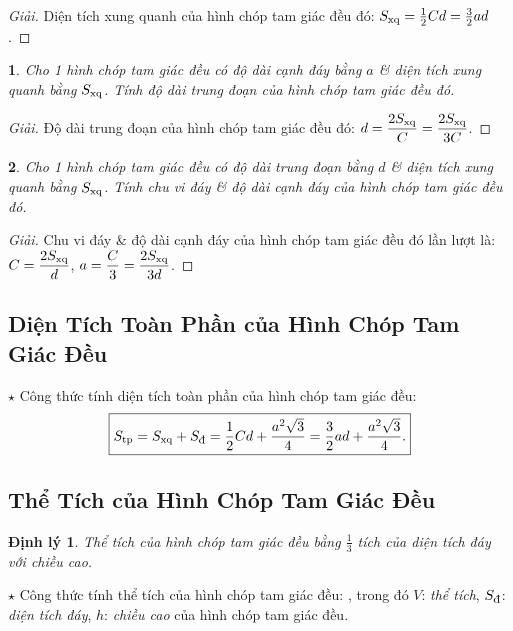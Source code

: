 \documentclass{article}
\newtheorem{baitoan}{}
\newtheorem{dinhly}{Định lý}
\begin{document}
\begin{proof}[Giải]
	Diện tích xung quanh của hình chóp tam giác đều đó: $S_{\rm xq} = \frac{1}{2}Cd = \frac{3}{2}ad$.
\end{proof}

\begin{baitoan}
	Cho 1 hình chóp tam giác đều có độ dài cạnh đáy bằng $a$ \& diện tích xung quanh bằng $S_{\rm xq}$. Tính độ dài trung đoạn của hình chóp tam giác đều đó.
\end{baitoan}

\begin{proof}[Giải]
	Độ dài trung đoạn của hình chóp tam giác đều đó: $d = \dfrac{2S_{\rm xq}}{C} = \dfrac{2S_{\rm xq}}{3C}$.
\end{proof}

\begin{baitoan}
	Cho 1 hình chóp tam giác đều có độ dài trung đoạn bằng $d$ \& diện tích xung quanh bằng $S_{\rm xq}$. Tính chu vi đáy \& độ dài cạnh đáy của hình chóp tam giác đều đó.
\end{baitoan}

\begin{proof}[Giải]
	Chu vi đáy \& độ dài cạnh đáy của hình chóp tam giác đều đó lần lượt là: $C = \dfrac{2S_{\rm xq}}{d}$, $a = \dfrac{C}{3} = \dfrac{2S_{\rm xq}}{3d}$.
\end{proof}

\subsection{Diện Tích Toàn Phần của Hình Chóp Tam Giác Đều}
\noindent$\star$ {\sf Công thức tính diện tích toàn phần của hình chóp tam giác đều:}
\begin{align*}
	\boxed{S_{\rm tp} = S_{\rm xq} + S_{\footnotesize\mbox{\rm đ}} = \frac{1}{2}Cd + \frac{a^2\sqrt{3}}{4} = \frac{3}{2}ad + \frac{a^2\sqrt{3}}{4}.}
\end{align*}

\subsection{Thể Tích của Hình Chóp Tam Giác Đều}

\begin{dinhly}
	Thể tích của hình chóp tam giác đều bằng $\frac{1}{3}$ tích của diện tích đáy với chiều cao.
\end{dinhly}
\noindent$\star$ {\sf Công thức tính thể tích của hình chóp tam giác đều:} , trong đó $V$: \textit{thể tích}, $S_{\footnotesize\mbox{\rm đ}}$: \textit{diện tích đáy}, $h$: \textit{chiều cao} của hình chóp tam giác đều.
\end{document}
